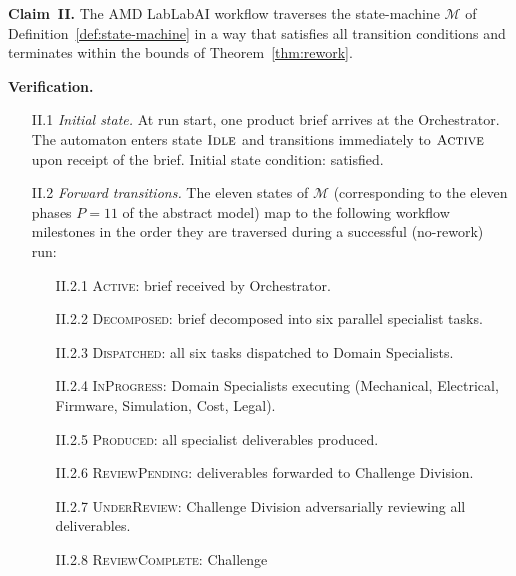 \documentclass[12pt]{article}
\theoremstyle{definition}
\begin{document}
\noindent\textbf{Claim~II.}  The AMD LabLabAI workflow traverses the
state-machine $\mathcal{M}$ of Definition~\ref{def:state-machine} in a
way that satisfies all transition conditions and terminates within the
bounds of Theorem~\ref{thm:rework}.

\medskip
\noindent\textbf{Verification.}
\begin{enumerate}
    \item[II.1] \emph{Initial state.}  At run start, one product brief
                arrives at the Orchestrator.  The automaton enters state
                $\textsc{Idle}$ and transitions immediately to
                $\textsc{Active}$ upon receipt of the brief.  Initial
                state condition: satisfied. \checkmark

    \item[II.2] \emph{Forward transitions.}  The eleven states of
                $\mathcal{M}$ (corresponding to the eleven phases $P=11$
                of the abstract model) map to the following workflow
                milestones in the order they are traversed during a
                successful (no-rework) run:
                \begin{enumerate}
                    \item[II.2.1] \textsc{Active}: brief received by
                                  Orchestrator.
                    \item[II.2.2] \textsc{Decomposed}: brief decomposed
                                  into six parallel specialist tasks.
                    \item[II.2.3] \textsc{Dispatched}: all six tasks
                                  dispatched to Domain Specialists.
                    \item[II.2.4] \textsc{InProgress}: Domain Specialists
                                  executing (Mechanical, Electrical,
                                  Firmware, Simulation, Cost, Legal).
                    \item[II.2.5] \textsc{Produced}: all specialist
                                  deliverables produced.
                    \item[II.2.6] \textsc{ReviewPending}: deliverables
                                  forwarded to Challenge Division.
                    \item[II.2.7] \textsc{UnderReview}: Challenge Division
                                  adversarially reviewing all deliverables.
                    \item[II.2.8] \textsc{ReviewComplete}: Challenge

\end{enumerate}
\end{enumerate}
\end{document}
